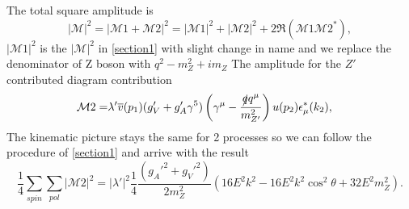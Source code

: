 \documentclass{report}
\numberwithin{equation}{section}
\begin{document}
The total square amplitude is 
\begin{equation}
|\mathcal{M}|^2=|\mathcal{M}1+\mathcal{M}2|^2=|\mathcal{M}1|^2+|\mathcal{M}2|^2+2\Re( \mathcal{M}1 \mathcal{M}2^*),\label{22}
\end{equation}
$|\mathcal{M}1|^2$ is the $|\mathcal{M}|^2$ in \ref{section1} with slight change in name and we replace the denominator of Z boson with $q^2-m_Z^2+im_Z$
The amplitude for the $Z'$ contributed diagram contribution
\begin{align}
\mathcal{M}2
=&\lambda' \overline{v}(p_1)(g_V'+g_A' \gamma^5)\left(\gamma^\mu-\frac{\slashed{q}q^\mu}{m_{Z'}^2}\right) u(p_2) \epsilon^*_\mu (k_2),
\end{align}
The kinematic picture stays the same for 2 processes so we can follow the  procedure of \ref{section1} and arrive with the result
\begin{equation}
\frac{1}{4}\sum_{spin} \sum_{pol} |\mathcal{M}2|^2=|\lambda'|^2\frac{1}{4} \frac{(g_A'^2 + g_V'^2)}{2m_{Z}^2} (16E^2k^2- 16E^2k^2\cos^2 \theta  +
   32 E^2m_{Z}^2).
\end{equation}
\end{document}
